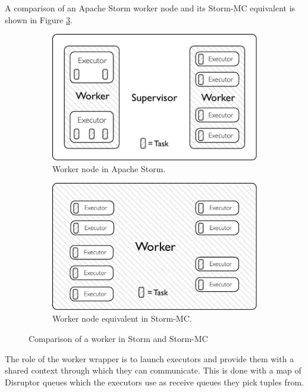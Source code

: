 A comparison of an Apache Storm worker node and its Storm-MC equivalent is shown in Figure \ref{fig:comparison}.

\begin{figure}[!htb]
\centering
\begin{subfigure}{.5\textwidth}
  \centering
  \includegraphics[width=0.95\linewidth]{pdf/distributed_worker.pdf}
  \caption{Worker node in Apache Storm.}
  \label{fig:comparison1}
\end{subfigure}%
\begin{subfigure}{.5\textwidth}
  \centering
  \includegraphics[width=0.95\linewidth]{pdf/local_worker.pdf}
  \caption{Worker node equivalent in Storm-MC.}
  \label{fig:comparison2}
\end{subfigure}
\caption{Comparison of a worker in Storm and Storm-MC}
\label{fig:comparison}
\end{figure}

The role of the worker wrapper is to launch executors and provide them with a shared context through which they can communicate. This is done with a map of Disruptor queues which the executors use as receive queues they pick tuples from.

